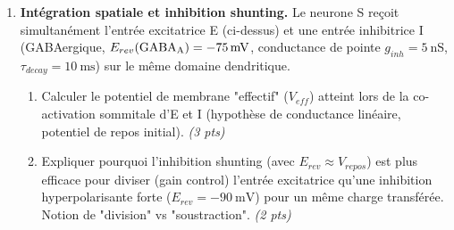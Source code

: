 \documentclass[11pt]{article}
\begin{document}
\begin{exercice}
\begin{enumerate}
\begin{enumerate}
        \item Comment distinguer expérimentalement cet effet pré-synaptique d'une action post-synaptique (ex: blocage partiel des récepteurs AMPA) en analysant le coefficient de variation (CV) des amplitudes de PPSE ou les échecs synaptiques ? \textit{(2 pts)}
    \end{enumerate}
    \item \textbf{Intégration spatiale et inhibition shunting.} Le neurone S reçoit simultanément l'entrée excitatrice E (ci-dessus) et une entrée inhibitrice I (GABAergique, $E_{rev}(\ce{GABA_A}) = \SI{-75}{\milli\volt}$, conductance de pointe $g_{inh} = \SI{5}{\nano\siemens}$, $\tau_{decay} = \SI{10}{\milli\second}$) sur le même domaine dendritique.
    \begin{enumerate}
        \item Calculer le potentiel de membrane "effectif" ($V_{eff}$) atteint lors de la co-activation sommitale d'E et I (hypothèse de conductance linéaire, potentiel de repos initial). \textit{(3 pts)}
        \item Expliquer pourquoi l'inhibition shunting (avec $E_{rev} \approx V_{repos}$) est plus efficace pour diviser (gain control) l'entrée excitatrice qu'une inhibition hyperpolarisante forte ($E_{rev} = \SI{-90}{\milli\volt}$) pour un même charge transférée. Notion de "division" vs "soustraction". \textit{(2 pts)}
    \end{enumerate}
\end{enumerate}
\end{exercice}
\end{document}
